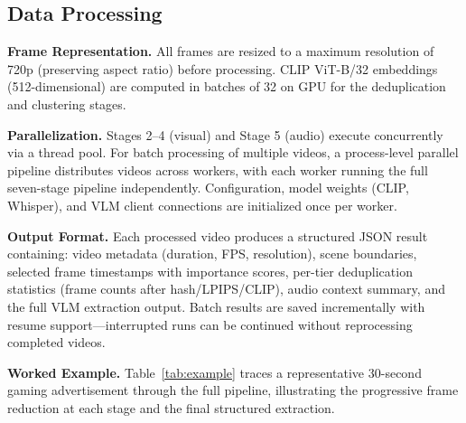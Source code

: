 \subsection{Data Processing}
\label{sec:data_processing}

\textbf{Frame Representation.} All frames are resized to a maximum resolution of 720p (preserving aspect ratio) before processing. CLIP ViT-B/32 embeddings (512-dimensional) are computed in batches of 32 on GPU for the deduplication and clustering stages.

\textbf{Parallelization.} Stages 2--4 (visual) and Stage 5 (audio) execute concurrently via a thread pool. For batch processing of multiple videos, a process-level parallel pipeline distributes videos across workers, with each worker running the full seven-stage pipeline independently. Configuration, model weights (CLIP, Whisper), and VLM client connections are initialized once per worker.

\textbf{Output Format.} Each processed video produces a structured JSON result containing: video metadata (duration, FPS, resolution), scene boundaries, selected frame timestamps with importance scores, per-tier deduplication statistics (frame counts after hash/LPIPS/CLIP), audio context summary, and the full VLM extraction output. Batch results are saved incrementally with resume support---interrupted runs can be continued without reprocessing completed videos.

\textbf{Worked Example.} Table~\ref{tab:example} traces a representative 30-second gaming advertisement through the full pipeline, illustrating the progressive frame reduction at each stage and the final structured extraction.

